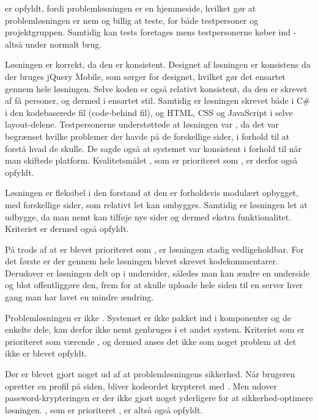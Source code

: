 
 er opfyldt, fordi problemløsningen er en hjemmeside, hvilket gør at problemløsningen er nem og billig at teste, for både testpersoner og projektgruppen. Samtidig kan tests foretages mens testpersonerne køber ind - altså under normalt brug.

Løsningen er korrekt, da den er konsistent. Designet af løsningen er konsistens da der bruges jQuery Mobile, som sørger for designet, hvilket gør det ensartet gennem hele løsningen. Selve koden er også relativt konsistent, da den er skrevet af få personer, og dermed i ensartet stil. Samtidig er løsningen skrevet både i C\# i den kodebaserede fil (code-behind fil), og HTML, CSS og JavaScript i selve layout-delene. Testpersonerne understøttede at løsningen var , da det var begrænset hvilke problemer der havde på de forskellige sider, i forhold til at forstå hvad de skulle. De sagde også at systemet var konsistent i forhold til når man skiftede platform. Kvalitetsmålet , som er prioriteret som , er derfor også opfyldt.

Løsningen er fleksibel i den forstand at den er forholdsvis modulært opbygget, med forskellige sider, som relativt let kan ombygges. Samtidig er løsningen let at udbygge, da man nemt kan tilføje nye sider og dermed ekstra funktionalitet. Kriteriet  er dermed også opfyldt. 

På trods af at  er blevet prioriteret som , er løsningen stadig vedligeholdbar. For det første er der gennem hele løsningen blevet skrevet kodekommentarer. Derudover er løsningen delt op i undersider, således man kan ændre en underside og blot offentliggøre den, frem for at skulle uploade hele siden til en server hver gang man har lavet en mindre ændring. 

Problemløsningen er ikke . Systemet er ikke pakket ind i komponenter og de enkelte dele, kan derfor ikke nemt genbruges i et andet system. Kriteriet  som er prioriteret som værende , og dermed anses det ikke som noget problem at det ikke er blevet opfyldt.

Der er blevet gjort noget ud af at problemløsningens sikkerhed. Når brugeren opretter en profil på siden, bliver kodeordet krypteret med . Men udover password-krypteringen er der ikke gjort noget yderligere for at sikkerhed-optimere løsningen. , som er prioriteret , er altså også opfyldt.

